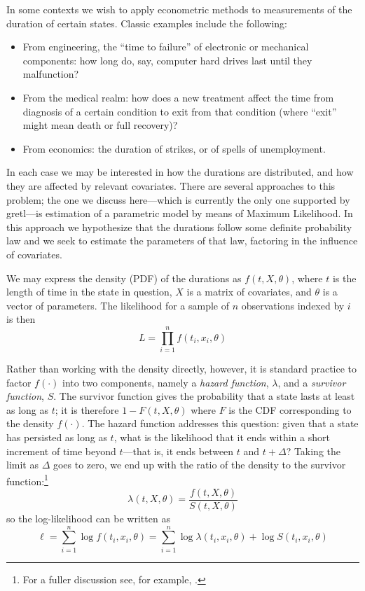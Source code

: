 In some contexts we wish to apply econometric methods to measurements
of the duration of certain states. Classic examples include the
following:
\begin{itemize}
\item From engineering, the ``time to failure'' of electronic or
  mechanical components: how long do, say, computer hard drives
  last until they malfunction?
\item From the medical realm: how does a new treatment affect the
  time from diagnosis of a certain condition to exit from that
  condition (where ``exit'' might mean death or full recovery)?
\item From economics: the duration of strikes, or of spells of
  unemployment.
\end{itemize}

In each case we may be interested in how the durations are
distributed, and how they are affected by relevant covariates.  There
are several approaches to this problem; the one we discuss
here---which is currently the only one supported by gretl---is
estimation of a parametric model by means of Maximum Likelihood.  In
this approach we hypothesize that the durations follow some definite
probability law and we seek to estimate the parameters of that law,
factoring in the influence of covariates.

We may express the density (PDF) of the durations as $f(t, X,
\theta)$, where $t$ is the length of time in the state in question,
$X$ is a matrix of covariates, and $\theta$ is a vector of parameters.
The likelihood for a sample of $n$ observations indexed by $i$ is then
\[
L = \prod_{i=1}^n f(t_i, x_i, \theta)
\]

Rather than working with the density directly, however, it is standard
practice to factor $f(\cdot)$ into two components, namely a
\emph{hazard function}, $\lambda$, and a \emph{survivor function},
$S$.  The survivor function gives the probability that a state lasts
at least as long as $t$; it is therefore $1 - F(t, X, \theta)$ where
$F$ is the CDF corresponding to the density $f(\cdot)$. The hazard
function addresses this question: given that a state has persisted as
long as $t$, what is the likelihood that it ends within a short
increment of time beyond $t$---that is, it ends between $t$ and $t +
\Delta$?  Taking the limit as $\Delta$ goes to zero, we end up with
the ratio of the density to the survivor function:\footnote{For a
  fuller discussion see, for example, \cite{davidson-mackinnon04}.}
\begin{equation}
\label{eq:surv-decomp}
\lambda(t, X, \theta) = \frac{f(t, X, \theta)}{S(t, X, \theta)}
\end{equation}
so the log-likelihood can be written as
\begin{equation}
\label{eq:surv-loglik}
\ell = \sum_{i=1}^n \log f(t_i, x_i, \theta) = 
\sum_{i=1}^n \log \lambda(t_i, x_i, \theta) + 
\log S(t_i, x_i, \theta)
\end{equation}

